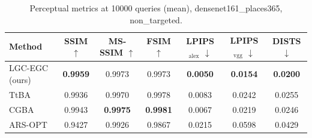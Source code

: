 \begin{table}[t]
\centering\footnotesize
\caption{Perceptual metrics at 10000 queries (mean), densenet161\_places365, non\_targeted.}
\begin{tabular}{lcccccc}
\toprule
Method & SSIM $\uparrow$ & MS-SSIM $\uparrow$ & FSIM $\uparrow$ & LPIPS$_{\mathrm{alex}}$ $\downarrow$ & LPIPS$_{\mathrm{vgg}}$ $\downarrow$ & DISTS $\downarrow$ \\
\midrule
LGC-EGC (ours) & \textbf{0.9959} & 0.9973 & 0.9973 & \textbf{0.0050} & \textbf{0.0154} & \textbf{0.0200} \\
TtBA & 0.9936 & 0.9970 & 0.9978 & 0.0083 & 0.0242 & 0.0255 \\
CGBA & 0.9943 & \textbf{0.9975} & \textbf{0.9981} & 0.0067 & 0.0219 & 0.0246 \\
ARS-OPT & 0.9427 & 0.9926 & 0.9867 & 0.0215 & 0.0598 & 0.0429 \\
\bottomrule
\end{tabular}
\end{table}
